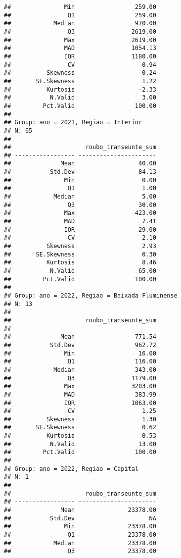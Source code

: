 \documentclass[
]{article}
\begin{document}
\begin{verbatim}
##               Min                 259.00
##                Q1                 259.00
##            Median                 970.00
##                Q3                2619.00
##               Max                2619.00
##               MAD                1054.13
##               IQR                1180.00
##                CV                   0.94
##          Skewness                   0.24
##       SE.Skewness                   1.22
##          Kurtosis                  -2.33
##           N.Valid                   3.00
##         Pct.Valid                 100.00
## 
## Group: ano = 2021, Regiao = Interior  
## N: 65  
## 
##                     roubo_transeunte_sum
## ----------------- ----------------------
##              Mean                  40.00
##           Std.Dev                  84.13
##               Min                   0.00
##                Q1                   1.00
##            Median                   5.00
##                Q3                  30.00
##               Max                 423.00
##               MAD                   7.41
##               IQR                  29.00
##                CV                   2.10
##          Skewness                   2.93
##       SE.Skewness                   0.30
##          Kurtosis                   8.46
##           N.Valid                  65.00
##         Pct.Valid                 100.00
## 
## Group: ano = 2022, Regiao = Baixada Fluminense  
## N: 13  
## 
##                     roubo_transeunte_sum
## ----------------- ----------------------
##              Mean                 771.54
##           Std.Dev                 962.72
##               Min                  16.00
##                Q1                 116.00
##            Median                 343.00
##                Q3                1179.00
##               Max                3203.00
##               MAD                 383.99
##               IQR                1063.00
##                CV                   1.25
##          Skewness                   1.30
##       SE.Skewness                   0.62
##          Kurtosis                   0.53
##           N.Valid                  13.00
##         Pct.Valid                 100.00
## 
## Group: ano = 2022, Regiao = Capital  
## N: 1  
## 
##                     roubo_transeunte_sum
## ----------------- ----------------------
##              Mean               23378.00
##           Std.Dev                     NA
##               Min               23378.00
##                Q1               23378.00
##            Median               23378.00
##                Q3               23378.00

\end{verbatim}
\end{document}
